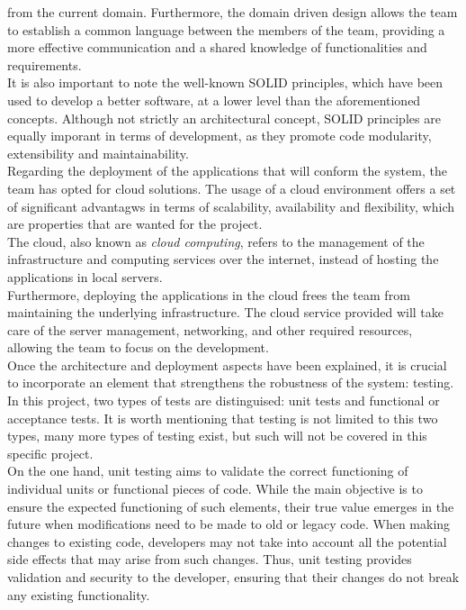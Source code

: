 \documentclass[../memory.tex]{subfiles}
\begin{document}
from the current domain. Furthermore, the domain driven design allows the team
to establish a common language between the members of the team, providing a more
effective communication and a shared knowledge of functionalities and
requirements.
\\
It is also important to note the well-known SOLID principles, which have been
used to develop a better software, at a lower level than the aforementioned
concepts. Although not strictly an architectural concept, SOLID principles are
equally imporant in terms of development, as they promote code modularity,
extensibility and maintainability.
\\[8pt]
Regarding the deployment of the applications that will conform the system, the
team has opted for cloud solutions. The usage of a cloud environment offers a
set of significant advantagws in terms of scalability, availability and
flexibility, which are properties that are wanted for the project.
\\
The cloud, also known as \emph{cloud computing}, refers to the management of the
infrastructure and computing services over the internet, instead of hosting the
applications in local servers.
\\
Furthermore, deploying the applications in the cloud frees the team from
maintaining the underlying infrastructure. The cloud service provided will take
care of the server management, networking, and other required resources,
allowing the team to focus on the development.
\\[8pt]
Once the architecture and deployment aspects have been explained, it is crucial
to incorporate an element that strengthens the robustness of the system:
testing. In this project, two types of tests are distinguised: unit tests and
functional or acceptance tests. It is worth mentioning that testing is not
limited to this two types, many more types of testing exist, but such will not
be covered in this specific project.
\\
On the one hand, unit testing aims to validate the correct functioning of
individual units or functional pieces of code. While the main objective is to
ensure the expected functioning of such elements, their true value emerges in
the future when modifications need to be made to old or legacy code. When making
changes to existing code, developers may not take into account all the potential
side effects that may arise from such changes. Thus, unit testing provides
validation and security to the developer, ensuring that their changes do not
break any existing functionality.
\end{document}
